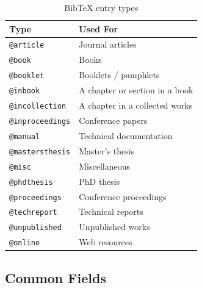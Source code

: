 \begin{table}[H]
\centering
\begin{tabular}{ll}
\toprule
\textbf{Type} & \textbf{Used For} \\
\midrule
\texttt{@article}       & Journal articles \\
\texttt{@book}          & Books \\
\texttt{@booklet}       & Booklets / pamphlets \\
\texttt{@inbook}        & A chapter or section in a book \\
\texttt{@incollection}  & A chapter in a collected works \\
\texttt{@inproceedings} & Conference papers \\
\texttt{@manual}        & Technical documentation \\
\texttt{@mastersthesis} & Master's thesis \\
\texttt{@misc}          & Miscellaneous \\
\texttt{@phdthesis}     & PhD thesis \\
\texttt{@proceedings}   & Conference proceedings \\
\texttt{@techreport}    & Technical reports \\
\texttt{@unpublished}   & Unpublished works \\
\texttt{@online}        & Web resources \\
\bottomrule
\end{tabular}
\caption{BibTeX entry types}
\end{table}

\subsection{Common Fields}


